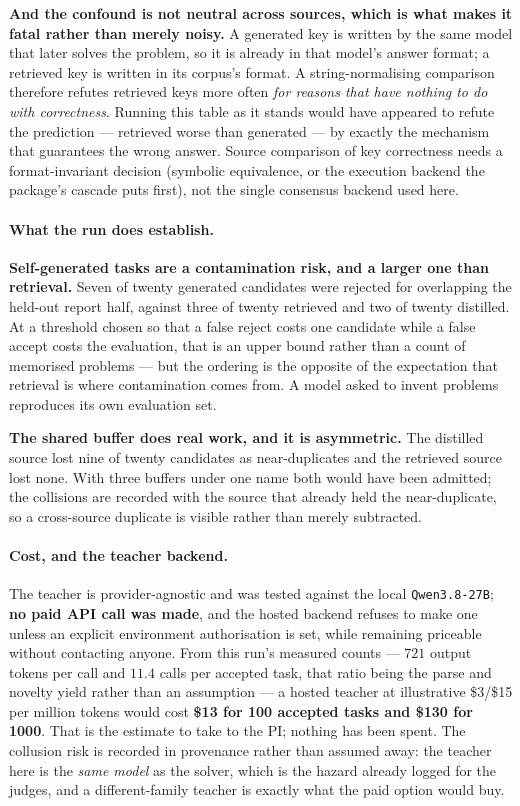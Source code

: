 \textbf{And the confound is not neutral across sources, which is what makes it fatal rather
than merely noisy.} A generated key is written by the same model that later solves the
problem, so it is already in that model's answer format; a retrieved key is written in its
corpus's format. A string-normalising comparison therefore refutes retrieved keys more often
\emph{for reasons that have nothing to do with correctness}. Running this table as it stands
would have appeared to refute the prediction --- retrieved worse than generated --- by exactly
the mechanism that guarantees the wrong answer. Source comparison of key correctness needs a
format-invariant decision (symbolic equivalence, or the execution backend the package's
cascade puts first), not the single consensus backend used here.

\paragraph{What the run does establish.}
\textbf{Self-generated tasks are a contamination risk, and a larger one than retrieval.}
Seven of twenty generated candidates were rejected for overlapping the held-out report half,
against three of twenty retrieved and two of twenty distilled. At a threshold chosen so that a
false reject costs one candidate while a false accept costs the evaluation, that is an upper
bound rather than a count of memorised problems --- but the ordering is the opposite of the
expectation that retrieval is where contamination comes from. A model asked to invent problems
reproduces its own evaluation set.

\textbf{The shared buffer does real work, and it is asymmetric.} The distilled source lost
nine of twenty candidates as near-duplicates and the retrieved source lost none. With three
buffers under one name both would have been admitted; the collisions are recorded with the
source that already held the near-duplicate, so a cross-source duplicate is visible rather
than merely subtracted.

\paragraph{Cost, and the teacher backend.} The teacher is provider-agnostic and was tested
against the local \texttt{Qwen3.8-27B}; \textbf{no paid API call was made}, and the hosted
backend refuses to make one unless an explicit environment authorisation is set, while
remaining priceable without contacting anyone. From this run's measured counts --- $721$
output tokens per call and $11.4$ calls per accepted task, that ratio being the parse and
novelty yield rather than an assumption --- a hosted teacher at illustrative \$3/\$15 per
million tokens would cost \textbf{\$13 for 100 accepted tasks and \$130 for 1000}. That is the
estimate to take to the PI; nothing has been spent. The collusion risk is recorded in
provenance rather than assumed away: the teacher here is the \emph{same model} as the solver,
which is the hazard already logged for the judges, and a different-family teacher is exactly
what the paid option would buy.

